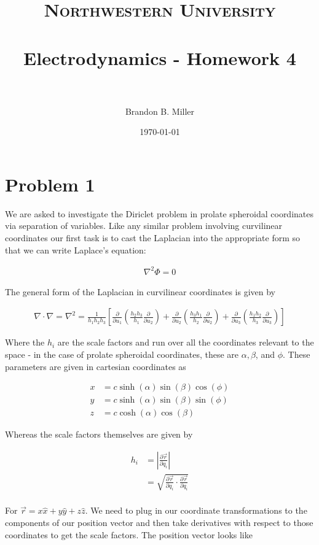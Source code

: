 \documentclass[paper=a4, fontsize=11pt]{scrartcl} %
\title{	
\normalfont \normalsize 
\textsc{Northwestern University} \\ [25pt] %
\horrule{0.5pt} \\[0.4cm] %
\huge Electrodynamics - Homework 4 \\ %
\horrule{2pt} \\[0.5cm] %
}
\author{Brandon B. Miller} %
\date{\normalsize\today} %
\newcommand{\partd}[2]{\frac{\partial #1}{\partial #2}}
\numberwithin{equation}{section} %
\numberwithin{figure}{section} %
\numberwithin{table}{section} %
\begin{document}
\maketitle %

\section{Problem 1}

We are asked to investigate the Diriclet problem in prolate spheroidal coordinates via separation of variables. Like any similar problem involving curvilinear coordinates our first task is to cast the Laplacian into the appropriate form so that we can write Laplace's equation:

\begin{align}
\nabla^2 \Phi = 0
\end{align}

The general form of the Laplacian in curvilinear coordinates is given by

\begin{align}
\nabla \cdot \nabla = \nabla^2 = \frac{1}{h_1 h_2 h_3}\left[\partd{}{u_1}\left(\frac{h_2 h_3}{h_1}\partd{}{u_2}\right) + \partd{}{u_2}\left(\frac{h_3h_1}{h_2}\partd{}{u_2}\right) + \partd{}{u_3}\left(\frac{h_1h_2}{h_3}\partd{}{u_3}\right)\right]
\end{align}

Where the $h_i$ are the scale factors and run over all the coordinates relevant to the space - in the case of prolate spheroidal coordinates, these are $\alpha, \beta$, and $\phi$. These parameters are given in cartesian coordinates as

\begin{align}
x &= c \sinh(\alpha)\sin(\beta)\cos(\phi) \\
y &= c \sinh(\alpha)\sin(\beta)\sin(\phi) \\
z &= c\cosh(\alpha)\cos(\beta)
\end{align}

Whereas the scale factors themselves are given by 

\begin{align}
h_i &= \left|\partd{\vec{r}}{q_i} \right| \\
&= \sqrt{\partd{\vec{r}}{q_i} \cdot \partd{\vec{r}}{q_i}} \\
\end{align}

For $\vec{r} = x\hat{x} + y\hat{y} + z\hat{z}$. We need to plug in our coordinate transformations to the components of our position vector and then take derivatives with respect to those coordinates to get the scale factors. The position vector looks like
\end{document}
